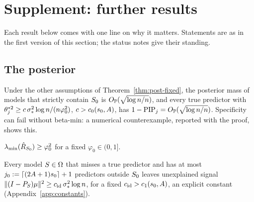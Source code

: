 \section{Supplement: further results}\label{sec:supp}

Each result below comes with one line on why it matters. Statements are as in the first version of this section; the
status notes give their standing.

\subsection{The posterior}\label{sec:supp-post}


\begin{remark}\label{rem:no-betamin}
Under the other assumptions of Theorem~\ref{thm:post-fixed}, the posterior mass of models that strictly contain $S_0$ is
$O_{\mathbb{P}}(\sqrt{\log n/n})$, and every true predictor with $\theta_j^{*2}\ge c\,\sigma_*^2\log n/(n\varphi_0^2)$, $c>c_0(s_0,A)$, has
$1-\mathrm{PIP}_j=O_{\mathbb{P}}(\sqrt{\log n/n})$. Specificity can fail without beta-min: a numerical counterexample, reported with the proof, shows this.
\end{remark}



\begin{localassumption}\label{asm:margin}
\begin{asmitems}
  \item $\lambda_{\min}(\hat R_{S_0})\ge\varphi_0^2$ for a fixed $\varphi_0\in(0,1]$.
  \item Every model $S\in\Omega$ that misses a true predictor and has at most $j_0:=\lceil(2A+1)s_0\rceil+1$ predictors
    outside $S_0$ leaves unexplained signal $\lVert (I-P_S)\mu\rVert^2\ge c_{\mathrm{id}}\,\sigma_*^2\log n$, for a fixed
    $c_{\mathrm{id}}>c_1(s_0,A)$, an explicit constant (Appendix~\ref{app:constants}).
\end{asmitems}
\end{localassumption}

